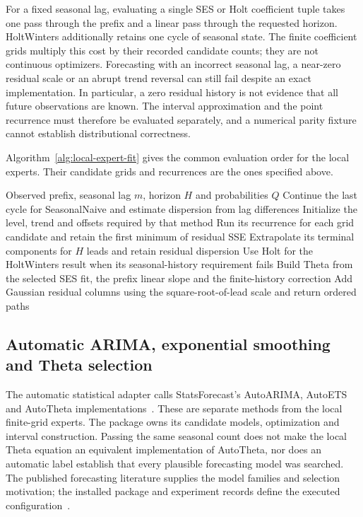 For a fixed seasonal lag, evaluating a single SES or Holt coefficient tuple takes one pass through the prefix and a linear pass through the requested horizon. HoltWinters additionally retains one cycle of seasonal state. The finite coefficient grids multiply this cost by their recorded candidate counts; they are not continuous optimizers. Forecasting with an incorrect seasonal lag, a near-zero residual scale or an abrupt trend reversal can still fail despite an exact implementation. In particular, a zero residual history is not evidence that all future observations are known. The interval approximation and the point recurrence must therefore be evaluated separately, and a numerical parity fixture cannot establish distributional correctness.

Algorithm~\ref{alg:local-expert-fit} gives the common evaluation order
for the local experts. Their candidate grids and recurrences are the
ones specified above.
\begin{algorithm}[htbp]
\caption{Fit and forecast the local seasonal continuation and smoothing experts on one observed prefix.}
\label{alg:local-expert-fit}
\begin{algorithmic}[1]
\Require Observed prefix, seasonal lag $m$, horizon $H$ and probabilities $Q$
\State Continue the last cycle for SeasonalNaive and estimate dispersion from lag differences
  \State Initialize the level, trend and offsets required by that method
  \State Run its recurrence for each grid candidate and retain the first minimum of residual SSE
  \State Extrapolate its terminal components for $H$ leads and retain residual dispersion
\EndFor
\State Use Holt for the HoltWinters result when its seasonal-history requirement fails
\State Build Theta from the selected SES fit, the prefix linear slope and the finite-history correction
\State Add Gaussian residual columns using the square-root-of-lead scale and return ordered paths
\end{algorithmic}
\end{algorithm}

\subsection{Automatic ARIMA, exponential smoothing and Theta selection}
\label{sec:method-automatic-statistical}
The automatic statistical adapter calls StatsForecast's AutoARIMA, AutoETS and AutoTheta implementations~\cite{statsforecast}. These are separate methods from the local finite-grid experts. The package owns its candidate models, optimization and interval construction. Passing the same seasonal count does not make the local Theta equation an equivalent implementation of AutoTheta, nor does an automatic label establish that every plausible forecasting model was searched. The published forecasting literature supplies the model families and selection motivation; the installed package and experiment records define the executed configuration~\cite{autoarima,etsstate}.

